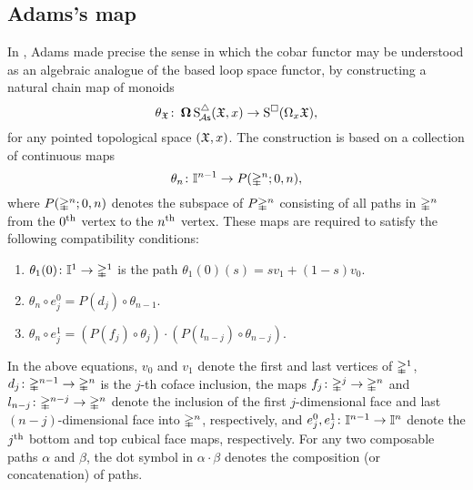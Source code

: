 
\subsection{Adams's map}\label{ss:adams maps} 
In \cite{adams1956cobar}, Adams made precise the sense in which the cobar functor may be understood as an algebraic analogue of the based loop space functor, by constructing a natural chain map of monoids
\begin{equation}\label{e:adams map 2}
	\theta_{\mathfrak{X}} \colon \operatorname{\mathbf{\Omega}} \operatorname{S^{\triangle}_{\!{\mathcal{A}\mathsf{s}}}}(\mathfrak{X},x) \to \operatorname{S^{\square}}(\Omega_x \mathfrak{X}),
\end{equation}
for any pointed topological space $(\mathfrak{X},x)$.
The construction is based on a collection of continuous maps
\[
\theta_n \colon \mathbb{I}^{n-1} \to P(\mathbb{\Delta}^n;0,n),
\]
where $P(\mathbb{\Delta}^n;0,n)$ denotes the subspace of $P \mathbb{\Delta}^n$ consisting of all paths in $\mathbb{\Delta}^n$ from the $0^{\mathrm{th}}$ vertex to the $n^{\mathrm{th}}$ vertex. These maps are required to satisfy the following compatibility conditions:
\begin{enumerate}
	\item $\theta_1(0)\colon \mathbb{I}^1 \to \mathbb{\Delta}^1$ is the path $\theta_1(0)(s) = sv_1 +(1-s)v_0$.
	\item $\theta_n \circ e_j^0 = P(d_j) \circ \theta_{n-1}$.
	\item $\theta_n \circ e_j^1 = (P(f_j) \circ \theta_j) \cdot (P(l_{n-j}) \circ \theta_{n-j})$.
\end{enumerate}
In the above equations, $v_0$ and $v_1$ denote the first and last vertices of $\mathbb{\Delta}^1$, $d_j \colon \mathbb{\Delta}^{n-1} \to \mathbb{\Delta}^n$ is the $j$-th coface inclusion, the maps $f_j\colon \mathbb{\Delta}^j \rightarrow \mathbb{\Delta}^n$ and $l_{n-j}\colon \mathbb{\Delta}^{n-j} \rightarrow \mathbb{\Delta}^n$ denote the inclusion of the first $j$-dimensional face and last $(n-j)$-dimensional face into $\mathbb{\Delta}^n$, respectively, and
$e_j^0,e_j^1\colon \mathbb{I}^{n-1} \rightarrow \mathbb{I}^{n}$ denote the $j^{\mathrm{th}}$ bottom and top cubical face maps, respectively.
For any two composable paths $\alpha$ and $\beta$, the dot symbol in $\alpha \cdot \beta$ denotes the composition (or concatenation) of paths.

